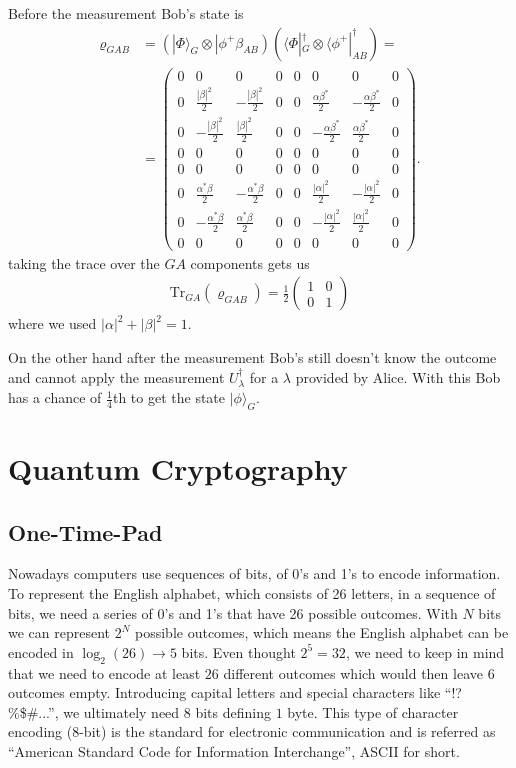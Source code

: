 \documentclass[a4paper]{article}
\begin{document}
Before the measurement Bob's state is
\begin{align}
    \varrho_{GAB} &=
    (|\Phi\rangle_G \otimes |\phi^+\beta_{AB})(\langle\Phi|_G^\dagger\otimes
    \langle\phi^+|_{AB}^\dagger)=\\
    &=
\begin{pmatrix}0 & 0 & 0 & 0 & 0 & 0 & 0 & 0\\0 & \frac{|\beta|^{2}}{2} & -
    \frac{|\beta|^{2}}{2} & 0 & 0 & \frac{\alpha\beta^*}{2} & -
    \frac{\alpha\beta^*}{2} & 0\\0 & -
\frac{|\beta|^{2}}{2} & \frac{|\beta|^{2}}{2} & 0 & 0 & - \frac{\alpha
    \beta^*}{2} & \frac{\alpha \beta^*}{2} &
0\\0 & 0 & 0 & 0 & 0 & 0 & 0 & 0\\0 & 0 & 0 & 0 & 0 & 0 & 0 & 0\\0 &
    \frac{\alpha^*
\beta}{2} & - \frac{\alpha^* \beta}{2} & 0 & 0 & \frac{|\alpha|^{2}}{2} & -
    \frac{|\alpha|^{2}}{2} & 0\\0 &
- \frac{\alpha^* \beta}{2} & \frac{\alpha^* \beta}{2} & 0 & 0 & -
    \frac{|\alpha|^{2}}{2} & \frac{|\alpha|^{2}}{2} &
0\\0 & 0 & 0 & 0 & 0 & 0 & 0 & 0\end{pmatrix}.
\end{align}
taking the trace over the $GA$ components gets us
\begin{align}
    \text{Tr}_{GA}(\varrho_{GAB}) = \frac{1}{2}
    \begin{pmatrix}
        1 & 0 \\
        0 & 1
    \end{pmatrix}
\end{align}
where we used $|\alpha|^2 + |\beta|^2 = 1$.

On the other hand after the measurement Bob's still doesn't know the outcome
and cannot apply the measurement $U_\lambda^\dagger$ for a
$\lambda$ provided by Alice. With this Bob has a chance of $\frac{1}{4}$th to
get the state $|\phi\rangle_G$.



\section{Quantum Cryptography}
\subsection{One-Time-Pad}
Nowadays computers use sequences of bits, of 0's and 1's to encode information.
To represent the English alphabet, which consists of 26 letters, in a sequence
of bits, we need a series of 0's and 1's that have 26 possible outcomes. With
$N$ bits we can represent $2^N$ possible outcomes, which means the English
alphabet can be encoded in $\log_2(26) \rightarrow 5$ bits.  Even thought $2^5
= 32$, we need to keep in mind that we need to encode at least $26$ different
outcomes which would then leave $6$ outcomes empty.  Introducing capital
letters and special characters like ``!?\%\$\#...'', we ultimately need $8$
bits defining $1$ byte. This type of character encoding ($8$-bit) is the
standard for electronic communication and is referred as ``American Standard
Code for Information Interchange'', ASCII for short.
\end{document}
